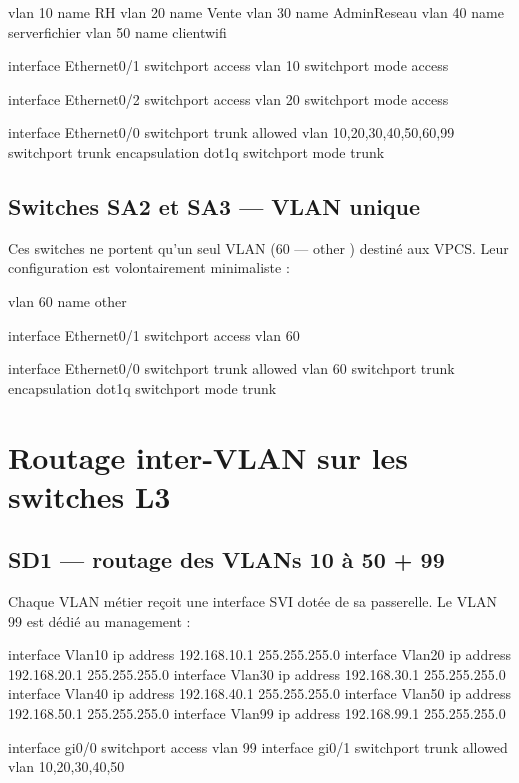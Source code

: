 \documentclass[11pt,a4paper]{article}
\begin{document}
\begin{ciscobox}
vlan 10
 name RH
vlan 20
 name Vente
vlan 30
 name AdminReseau
vlan 40
 name serverfichier
vlan 50
 name clientwifi

interface Ethernet0/1
 switchport access vlan 10
 switchport mode access

interface Ethernet0/2
 switchport access vlan 20
 switchport mode access

interface Ethernet0/0
 switchport trunk allowed vlan 10,20,30,40,50,60,99
 switchport trunk encapsulation dot1q
 switchport mode trunk
\end{ciscobox}

\subsection{Switches SA2 et SA3 — VLAN unique}

Ces switches ne portent qu'un seul VLAN (60 — \og other \fg{}) destiné aux VPCS. Leur configuration est volontairement minimaliste :

\begin{ciscobox}
vlan 60
 name other

interface Ethernet0/1
 switchport access vlan 60

interface Ethernet0/0
 switchport trunk allowed vlan 60
 switchport trunk encapsulation dot1q
 switchport mode trunk
\end{ciscobox}

\section{Routage inter-VLAN sur les switches L3}

\subsection{SD1 — routage des VLANs 10 à 50 + 99}

Chaque VLAN métier reçoit une interface SVI dotée de sa passerelle. Le VLAN 99 est dédié au management :

\begin{ciscobox}
interface Vlan10
 ip address 192.168.10.1 255.255.255.0
interface Vlan20
 ip address 192.168.20.1 255.255.255.0
interface Vlan30
 ip address 192.168.30.1 255.255.255.0
interface Vlan40
 ip address 192.168.40.1 255.255.255.0
interface Vlan50
 ip address 192.168.50.1 255.255.255.0
interface Vlan99
 ip address 192.168.99.1 255.255.255.0

interface gi0/0
 switchport access vlan 99
interface gi0/1
 switchport trunk allowed vlan 10,20,30,40,50
\end{ciscobox}
\end{document}
